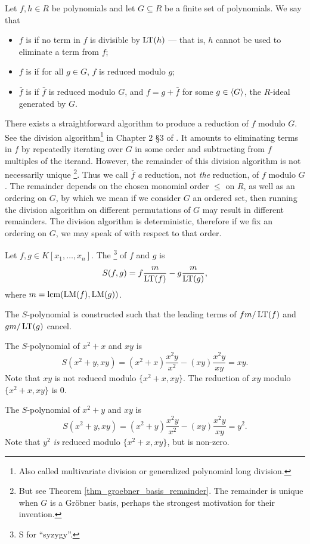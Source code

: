 \begin{definition}
  Let $f, h \in R$ be polynomials and let $G \subseteq R$ be a finite set of polynomials.
  We say that
  \begin{itemize}
    \item $f$ is  if no term in $f$ is divisible by $\operatorname{LT}(h)$ ---
          that is, $h$ cannot be used to eliminate a term from $f$;
    \item $f$ is  if for all $g \in G$, $f$ is reduced modulo $g$;
    \item $\bar f$ is  if $\bar f$ is reduced modulo $G$,
          and $f = g + \bar f$ for some $g \in \left\langle G \right\rangle$, the $R$-ideal generated by $G$.
  \end{itemize}
\end{definition}
There exists a straightforward algorithm to produce a reduction of $f$ modulo $G$.
See the division algorithm\footnote{Also called multivariate division or generalized polynomial long division.}
in Chapter 2 \S3 of \cite{cox07}.
It amounts to eliminating terms in $f$ by repeatedly iterating over $G$ in some order
and subtracting from $f$ multiples of the iterand.
However, the remainder of this division algorithm is not necessarily unique
\footnote{But see Theorem \ref{thm_groebner_basis_remainder}.
The remainder is unique when $G$ is a Gr\"obner basis, perhaps the strongest motivation for their invention.}.
Thus we call $\bar f$ \emph{a} reduction, not \emph{the} reduction, of $f$ modulo $G$.
The remainder depends on the chosen monomial order $\leq$ on $R$, as well as an ordering on $G$,
by which we mean if we consider $G$ an ordered set, then running the division algorithm on different permutations of $G$
may result in different remainders.
The division algorithm is deterministic, therefore if we fix an ordering on $G$, we may speak of  with respect to that order.

\begin{definition}
  Let $f, g \in K[x_1, \ldots, x_n]$. The \footnote{S for ``syzygy''.} of $f$ and $g$ is
  \[ S(f,g) = f \frac m {\operatorname{LT}(f)} - g \frac m {\operatorname{LT}(g)}, \]
  where $m = \operatorname{lcm}(\operatorname{LM}(f), \operatorname{LM}(g))$.
\end{definition}

The $S$-polynomial is constructed such that the leading terms of $f m / \operatorname{LT}(f)$ and $g m / \operatorname{LT}(g)$ cancel.

\begin{example}
  \label{ex_groebner_2b}
  The $S$-polynomial of $x^2 + x$ and $xy$ is
  \[ S(x^2 + y, xy) = (x^2 + x) \frac{x^2y}{x^2} - (xy)\frac{x^2y}{xy} = xy. \]
  Note that $xy$ is not reduced modulo $\{x^2 + x, xy\}$.
  The reduction of $xy$ modulo $\{x^2 + x, xy\}$ is 0.
\end{example}
\begin{example}
  \label{ex_groebner_3b}
  The $S$-polynomial of $x^2 + y$ and $xy$ is
  \[ S(x^2 + y, xy) = (x^2 + y) \frac{x^2y}{x^2} - (xy)\frac{x^2y}{xy} = y^2. \]
  Note that $y^2$ \emph{is} reduced modulo $\{x^2 + x, xy\}$, but is non-zero.
\end{example}

